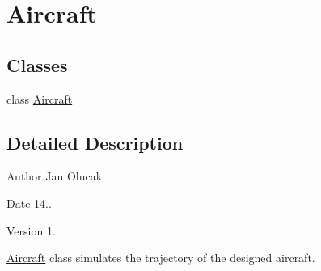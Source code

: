 \hypertarget{group___aircaft}{}\section{Aircraft}
\label{group___aircaft}
\subsection*{Classes}
\begin{DoxyCompactItemize}
\item 
class \hyperlink{class_aircraft}{Aircraft}
\end{DoxyCompactItemize}


\subsection{Detailed Description}
\begin{DoxyAuthor}{Author}
Jan Olucak 
\end{DoxyAuthor}
\begin{DoxyDate}{Date}
14.. 
\end{DoxyDate}
\begin{DoxyVersion}{Version}
1.
\end{DoxyVersion}
\hyperlink{class_aircraft}{Aircraft} class simulates the trajectory of the designed aircraft. 